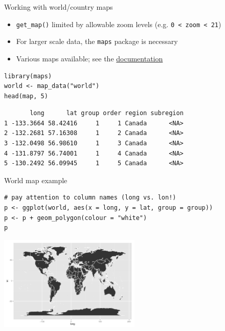 \documentclass[sans,aspectratio=169,presentation,bigger,fleqn]{beamer}
\begin{document}
\begin{frame}[fragile,label=sec-10]{Working with world/country maps}
 \begin{itemize}
\item \texttt{get\_map()} limited by allowable zoom levels (e.g. \texttt{0 < zoom < 21})
\item For larger scale data, the \texttt{maps} package is necessary
\item Various maps available; see the \href{http://cran.r-project.org/web/packages/maps/maps.pdf}{documentation}
\end{itemize}

\scriptsize
\begin{verbatim}
library(maps)
world <- map_data("world")
head(map, 5)
\end{verbatim}

\begin{verbatim}
       long      lat group order region subregion
1 -133.3664 58.42416     1     1 Canada      <NA>
2 -132.2681 57.16308     1     2 Canada      <NA>
3 -132.0498 56.98610     1     3 Canada      <NA>
4 -131.8797 56.74001     1     4 Canada      <NA>
5 -130.2492 56.09945     1     5 Canada      <NA>
\end{verbatim}
\end{frame}
\begin{frame}[fragile,label=sec-11]{World map example}
 \scriptsize
\begin{verbatim}
# pay attention to column names (long vs. lon!)
p <- ggplot(world, aes(x = long, y = lat, group = group))
p <- p + geom_polygon(colour = "white")
p
\end{verbatim}

\begin{center}
\includegraphics[height=4.5cm]{./plots/world.pdf}
\end{center}

\normalsize
\end{frame}
\end{document}

